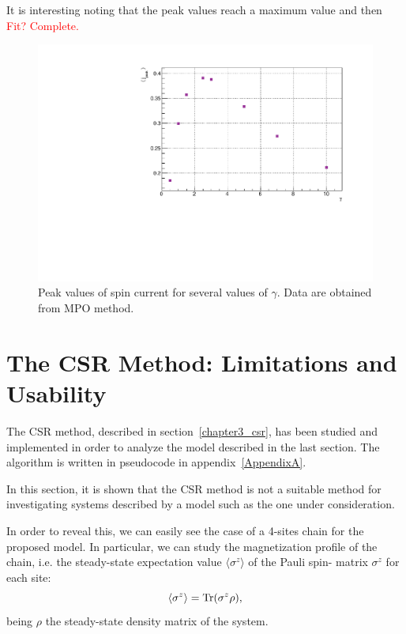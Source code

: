 It is interesting noting that the peak values reach a maximum value and then 
\textcolor{red}{Fit? Complete.}

\begin{figure}[H]
    \centering
    \includegraphics[scale=0.7]{Figures/PeakValueSpinCurrVSgamma_8sites.pdf}
    \caption{Peak values of spin current for several values of $\gamma$. Data are obtained from MPO method.}
    \label{fig:PeakValueSpinCurrVSgamma_8sites}
\end{figure}


\section{The CSR Method: Limitations and Usability}
The CSR method, described in section~\ref{chapter3_csr}, has been studied and implemented in order to analyze the model described in the last section. The algorithm is written in pseudocode in appendix~\ref{AppendixA}.

In this section, it is shown that the CSR method is not a suitable method for investigating systems described by a model such as the one under consideration.

In order to reveal this, we can easily see the case of a 4-sites chain for the proposed model. In particular, we can study the magnetization profile of the chain, i.e. the steady-state expectation value $\langle \sigma^z \rangle$ of the Pauli spin- matrix $\sigma^z$ for each site:
\begin{equation*}
    \langle \sigma^z \rangle = \operatorname{Tr}(\sigma^z \rho),
\end{equation*}
being $\rho$ the steady-state density matrix of the system.

